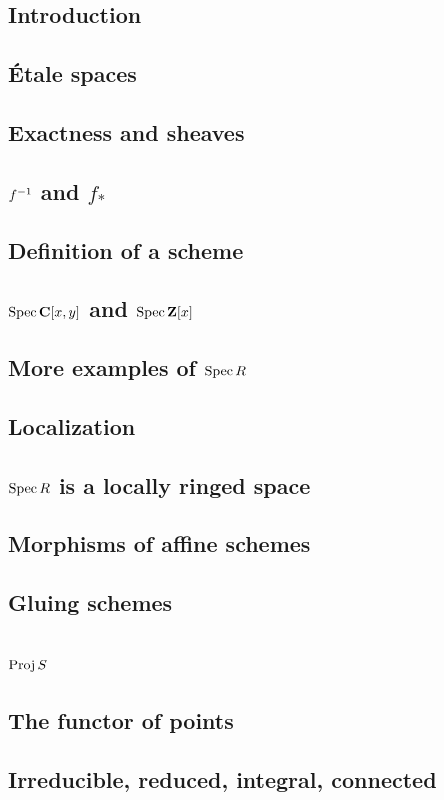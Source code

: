 \documentclass[11pt, oneside,margin=1in]{article}
\begin{document}
\subsection{Introduction}
\subsection{\'Etale spaces}
\subsection{Exactness and sheaves}
\subsection{$f^{-1}$ and $f_*$}
\subsection{Definition of a scheme}
\subsection{$\operatorname{Spec} \mathbf C[x,y]$ and $\operatorname{Spec} \mathbf Z[x]$}
\subsection{More examples of $\operatorname{Spec} R$}
\subsection{Localization}
\subsection{$\operatorname{Spec} R$ is a locally ringed space}
\subsection{Morphisms of affine schemes}
\subsection{Gluing schemes}
\subsection{$\operatorname{Proj} S$}
\subsection{The functor of points}
\subsection{Irreducible, reduced, integral, connected}
\end{document}
